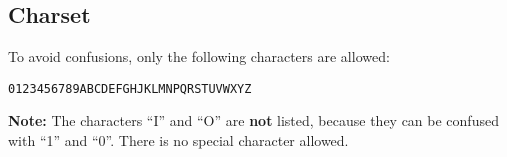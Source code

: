 %
%
%
%
%
%
%

\subsection{Charset}

To avoid confusions, only the following characters are allowed:

\begin{verbatim}
0123456789ABCDEFGHJKLMNPQRSTUVWXYZ
\end{verbatim}

\textbf{Note:} The characters ``I'' and ``O'' are \textbf{not} listed, because
they can be confused with ``1'' and ``0''. There is no special character allowed.
